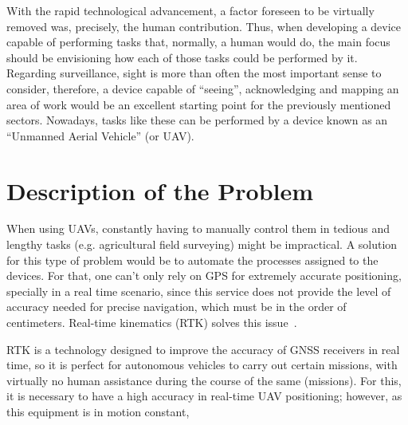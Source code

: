 With the rapid technological advancement, a factor foreseen to be virtually removed was, precisely, the human contribution. Thus, when developing a device capable of performing tasks that, normally, a human would do, the main focus should be envisioning how each of those tasks could be performed by it.
Regarding surveillance, sight is more than often the most important sense to consider, therefore, a device capable of ``seeing'', acknowledging and mapping an area of work would be an excellent starting point for the previously mentioned sectors. Nowadays, tasks like these can be performed by a device known as an ``Unmanned Aerial Vehicle'' (or UAV).


\section{Description of the Problem}\label{I_description}

When using UAVs, constantly having to manually control them in tedious and lengthy tasks (e.g. agricultural field surveying) might be impractical.
A solution for this type of problem would be to automate the processes assigned to the devices. For that, one can't only rely on GPS for extremely accurate positioning, specially in a real time scenario, since this service does not provide the level of accuracy needed for precise navigation, which must be in the order of centimeters. Real-time kinematics (RTK) solves this issue~\cite{gps_USGov,8714161}.

RTK is a technology designed to improve the accuracy of GNSS receivers in real time, so it is perfect for autonomous vehicles to carry out certain missions, with virtually no human assistance during the course of the same (missions). For this, it is necessary to have a high accuracy in real-time UAV positioning;
however, as this equipment is in motion constant,

